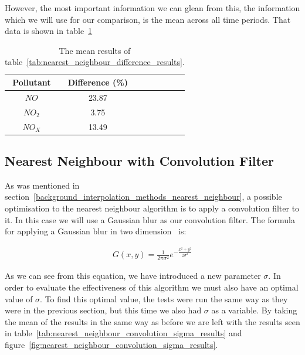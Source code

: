 			 

			However, the most important information we can glean from this, the information which we will use for our comparison, is the mean across all time periods. That data is shown in table~\ref{tab:nearest_neighbour_difference_results_mean}

			\begin{table}[H]
				\centering
	    		\begin{tabular}{|c|c|c|c|c|c|c|}
	    			\hline
			        Pollutant & Difference (\%) \\ \hline
					$NO$ & 23.87 \\
					$NO_{2}$ & 3.75 \\
					$NO_{X}$ & 13.49 \\ \hline
				\end{tabular}
				\caption{The mean results of table~\ref{tab:nearest_neighbour_difference_results}.}
				\label{tab:nearest_neighbour_difference_results_mean}
			\end{table}

		\subsection{Nearest Neighbour with Convolution Filter}\label{prediction_evaluation_results_nearest_neighbour_convolution_filter}

			As was mentioned in section~\ref{background_interpolation_methods_nearest_neighbour}, a possible optimisation to the nearest neighbour algorithm is to apply a convolution filter to it. In this case we will use a Gaussian blur as our convolution filter. The formula for applying a Gaussian blur in two dimension~\cite{gaussianblur} is:

			\begin{align*}
				G(x,y) = \frac{1}{2\pi\sigma^{2}} e^{-\frac{x^{2} + y^{2}}{2\sigma^{2}}}
			\end{align*}

			As we can see from this equation, we have introduced a new parameter $\sigma$. In order to evaluate the effectiveness of this algorithm we must also have an optimal value of $\sigma$. To find this optimal value, the tests were run the same way as they were in the previous section, but this time we also had $\sigma$ as a variable. By taking the mean of the results in the same way as before we are left with the results seen in table~\ref{tab:nearest_neighbour_convolution_sigma_results} and figure~\ref{fig:nearest_neighbour_convolution_sigma_results}. 

